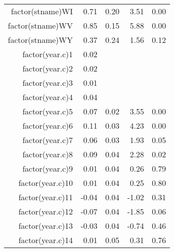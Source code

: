 \begin{table}[ht]
\begin{tabular}{rrrrr}
  factor(stname)WI & 0.71 & 0.20 & 3.51 & 0.00 \\ 
  factor(stname)WV & 0.85 & 0.15 & 5.88 & 0.00 \\ 
  factor(stname)WY & 0.37 & 0.24 & 1.56 & 0.12 \\ 
  factor(year.c)1 & 0.02 &  &  &  \\ 
  factor(year.c)2 & 0.02 &  &  &  \\ 
  factor(year.c)3 & 0.01 &  &  &  \\ 
  factor(year.c)4 & 0.04 &  &  &  \\ 
  factor(year.c)5 & 0.07 & 0.02 & 3.55 & 0.00 \\ 
  factor(year.c)6 & 0.11 & 0.03 & 4.23 & 0.00 \\ 
  factor(year.c)7 & 0.06 & 0.03 & 1.93 & 0.05 \\ 
  factor(year.c)8 & 0.09 & 0.04 & 2.28 & 0.02 \\ 
  factor(year.c)9 & 0.01 & 0.04 & 0.26 & 0.79 \\ 
  factor(year.c)10 & 0.01 & 0.04 & 0.25 & 0.80 \\ 
  factor(year.c)11 & -0.04 & 0.04 & -1.02 & 0.31 \\ 
  factor(year.c)12 & -0.07 & 0.04 & -1.85 & 0.06 \\ 
  factor(year.c)13 & -0.03 & 0.04 & -0.74 & 0.46 \\ 
  factor(year.c)14 & 0.01 & 0.05 & 0.31 & 0.76 \\ 
   \hline
\end{tabular}
\end{table}
